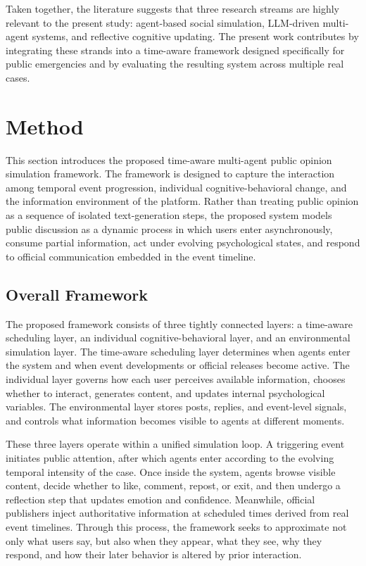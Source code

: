\documentclass[11pt]{article}
\begin{document}
Taken together, the literature suggests that three research streams are highly relevant to the present study: agent-based social simulation, LLM-driven multi-agent systems, and reflective cognitive updating. The present work contributes by integrating these strands into a time-aware framework designed specifically for public emergencies and by evaluating the resulting system across multiple real cases.

\section{Method}
This section introduces the proposed time-aware multi-agent public opinion simulation framework. The framework is designed to capture the interaction among temporal event progression, individual cognitive-behavioral change, and the information environment of the platform. Rather than treating public opinion as a sequence of isolated text-generation steps, the proposed system models public discussion as a dynamic process in which users enter asynchronously, consume partial information, act under evolving psychological states, and respond to official communication embedded in the event timeline.

\subsection{Overall Framework}
The proposed framework consists of three tightly connected layers: a time-aware scheduling layer, an individual cognitive-behavioral layer, and an environmental simulation layer. The time-aware scheduling layer determines when agents enter the system and when event developments or official releases become active. The individual layer governs how each user perceives available information, chooses whether to interact, generates content, and updates internal psychological variables. The environmental layer stores posts, replies, and event-level signals, and controls what information becomes visible to agents at different moments.

These three layers operate within a unified simulation loop. A triggering event initiates public attention, after which agents enter according to the evolving temporal intensity of the case. Once inside the system, agents browse visible content, decide whether to like, comment, repost, or exit, and then undergo a reflection step that updates emotion and confidence. Meanwhile, official publishers inject authoritative information at scheduled times derived from real event timelines. Through this process, the framework seeks to approximate not only what users say, but also when they appear, what they see, why they respond, and how their later behavior is altered by prior interaction.
\end{document}
